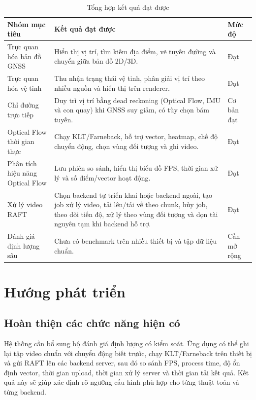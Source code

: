 \documentclass[../DoAn.tex]{subfiles}
\begin{document}
\begin{table}[H]
\centering
\begin{tabular}{|p{4.0cm}|p{7.0cm}|p{2.0cm}|}
\hline
\textbf{Nhóm mục tiêu} & \textbf{Kết quả đạt được} & \textbf{Mức độ} \\ \hline
Trực quan hóa bản đồ GNSS & Hiển thị vị trí, tìm kiếm địa điểm, vẽ tuyến đường và chuyển giữa bản đồ 2D/3D. & Đạt \\ \hline
Trực quan hóa vệ tinh & Thu nhận trạng thái vệ tinh, phân giải vị trí theo nhiều nguồn và hiển thị trên renderer. & Đạt \\ \hline
Chỉ đường trực tiếp & Duy trì vị trí bằng dead reckoning (Optical Flow, IMU và con quay) khi GNSS suy giảm, có tùy chọn bám tuyến. & Cơ bản đạt \\ \hline
Optical Flow thời gian thực & Chạy KLT/Farneback, hỗ trợ vector, heatmap, chế độ chuyển động, chọn vùng đối tượng và ghi video. & Đạt \\ \hline
Phân tích hiệu năng Optical Flow & Lưu phiên so sánh, hiển thị biểu đồ FPS, thời gian xử lý và số điểm/vector hoạt động. & Đạt \\ \hline
Xử lý video RAFT & Chọn backend tự triển khai hoặc backend ngoài, tạo job xử lý video, tải lên/tải về theo chunk, hủy job, theo dõi tiến độ, xử lý theo vùng đối tượng và dọn tài nguyên tạm khi backend hỗ trợ. & Đạt \\ \hline
Đánh giá định lượng sâu & Chưa có benchmark trên nhiều thiết bị và tập dữ liệu chuẩn. & Cần mở rộng \\ \hline
\end{tabular}
\caption{Tổng hợp kết quả đạt được}
\label{table:conclusion-results}
\end{table}

\section{Hướng phát triển}
\label{section:6.2}
\subsection{Hoàn thiện các chức năng hiện có}
\label{subsection:6.2.1}
Hệ thống cần bổ sung bộ đánh giá định lượng có kiểm soát. Ứng dụng có thể ghi lại tập video chuẩn với chuyển động biết trước, chạy KLT/Farneback trên thiết bị và gửi RAFT lên các backend server, sau đó so sánh FPS, process time, độ ổn định vector, thời gian upload, thời gian xử lý server và thời gian tải kết quả. Kết quả này sẽ giúp xác định rõ ngưỡng cấu hình phù hợp cho từng thuật toán và từng backend.
\end{document}
